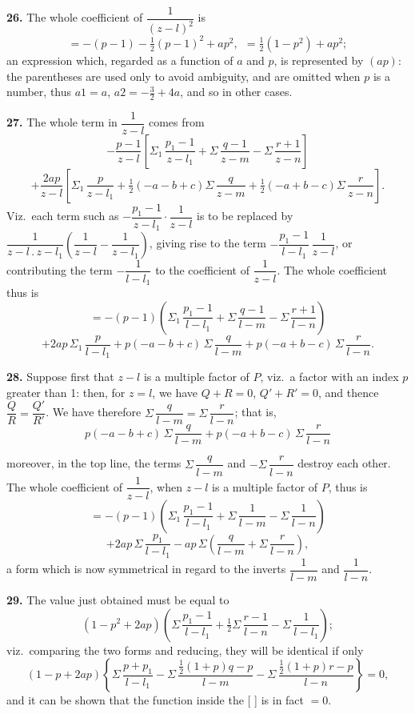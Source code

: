 \documentclass[11pt]{article}
\newcommand{\artno}[1]{\textbf{#1.}\quad}
\begin{document}
\artno{26} The whole coefficient of $\dfrac{1}{(z-l)^{2}}$ is
\[
   = -(p-1) - \tfrac{1}{2}(p-1)^{2} + ap^{2},\ \ = \tfrac{1}{2}(1 - p^{2}) + ap^{2};
\]
an expression which, regarded as a function of $a$ and $p$, is represented by $(ap)$: the
parentheses are used only to avoid ambiguity, and are omitted when $p$ is a number,
thus $a1 = a$, $a2 = -\tfrac{3}{2} + 4a$, and so in other cases.

\artno{27} The whole term in $\dfrac{1}{z-l}$ comes from
\[
   -\frac{p-1}{z-l}\!\left[\Sigma_{1}\,\frac{p_{1}-1}{z-l_{1}} + \Sigma\,\frac{q-1}{z-m} - \Sigma\,\frac{r+1}{z-n}\right]
\]
\[
   + \frac{2ap}{z-l}\!\left[\Sigma_{1}\,\frac{p}{z-l_{1}} + \tfrac{1}{2}(-a-b+c)\Sigma\,\frac{q}{z-m} + \tfrac{1}{2}(-a+b-c)\Sigma\,\frac{r}{z-n}\right].
\]
Viz.\ each term such as $-\dfrac{p_{1}-1}{z-l_{1}}\cdot\dfrac{1}{z-l}$ is to be replaced by $\dfrac{1}{z-l\,.\,z-l_{1}}\!\left(\dfrac{1}{z-l} - \dfrac{1}{z-l_{1}}\right)$, giving
rise to the term $-\dfrac{p_{1}-1}{l-l_{1}}\,\dfrac{1}{z-l}$, or contributing the term $-\dfrac{1}{l-l_{1}}$ to the coefficient of $\dfrac{1}{z-l}$.
The whole coefficient thus is
\[
   = -(p-1)\!\left(\Sigma_{1}\,\frac{p_{1}-1}{l-l_{1}} + \Sigma\,\frac{q-1}{l-m} - \Sigma\,\frac{r+1}{l-n}\right)
\]
\[
   + 2ap\,\Sigma_{1}\,\frac{p}{l-l_{1}} + p(-a-b+c)\,\Sigma\,\frac{q}{l-m} + p(-a+b-c)\,\Sigma\,\frac{r}{l-n}.
\]

\artno{28} Suppose first that $z-l$ is a multiple factor of $P$, viz.\ a factor with an index $p$
greater than 1: then, for $z = l$, we have $Q + R = 0$, $Q' + R' = 0$, and thence $\dfrac{Q}{R} = \dfrac{Q'}{R'}$.
We have therefore $\Sigma\,\dfrac{q}{l-m} = \Sigma\,\dfrac{r}{l-n}$; that is,
\[
   p(-a-b+c)\,\Sigma\,\frac{q}{l-m} + p(-a+b-c)\,\Sigma\,\frac{r}{l-n}
\]

\newpage
moreover, in the top line, the terms $\Sigma\,\dfrac{q}{l-m}$ and $-\Sigma\,\dfrac{r}{l-n}$ destroy each other. The
whole coefficient of $\dfrac{1}{z-l}$, when $z-l$ is a multiple factor of $P$, thus is
\[
   = -(p-1)\!\left(\Sigma_{1}\,\frac{p_{1}-1}{l-l_{1}} + \Sigma\,\frac{1}{l-m} - \Sigma\,\frac{1}{l-n}\right)
\]
\[
   + 2ap\,\Sigma\,\frac{p_{1}}{l-l_{1}} - ap\,\Sigma\!\left(\frac{q}{l-m} + \Sigma\,\frac{r}{l-n}\right),
\]
a form which is now symmetrical in regard to the inverts $\dfrac{1}{l-m}$ and $\dfrac{1}{l-n}$.

\artno{29} The value just obtained must be equal to
\[
   (1 - p^{2} + 2ap)\!\left(\Sigma\,\frac{p_{1}-1}{l-l_{1}} + \tfrac{1}{2}\Sigma\,\frac{r-1}{l-n} - \Sigma\,\frac{1}{l-l_{1}}\right);
\]
viz.\ comparing the two forms and reducing, they will be identical if only
\[
   (1 - p + 2ap)\!\left\{\Sigma\,\frac{p+p_{1}}{l-l_{1}} - \Sigma\,\frac{\tfrac{1}{2}(1+p)q - p}{l-m} - \Sigma\,\frac{\tfrac{1}{2}(1+p)r - p}{l-n}\right\} = 0,
\]
and it can be shown that the function inside the [ ] is in fact $=0$.
\end{document}
